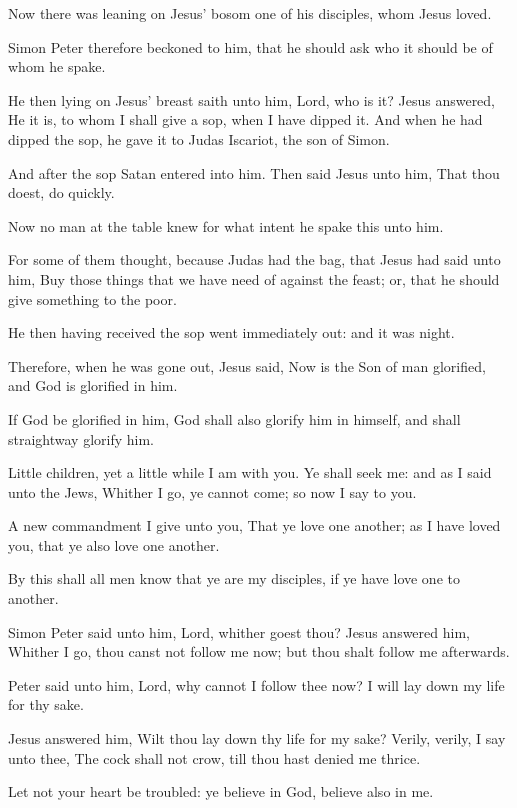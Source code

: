 \Verse Now there was leaning on Jesus' bosom one of his disciples, whom Jesus loved.

\Verse Simon Peter therefore beckoned to him, that he should ask who it should be of whom he spake.

\Verse He then lying on Jesus' breast saith unto him, Lord, who is it?  \Verse Jesus answered, He it is, to whom I shall give a sop, when I have dipped it. And when he had dipped the sop, he gave it to Judas Iscariot, the son of Simon.

\Verse And after the sop Satan entered into him. Then said Jesus unto him, That thou doest, do quickly.

\Verse Now no man at the table knew for what intent he spake this unto him.

\Verse For some of them thought, because Judas had the bag, that Jesus had said unto him, Buy those things that we have need of against the feast; or, that he should give something to the poor.

\Verse He then having received the sop went immediately out: and it was night.

\Verse Therefore, when he was gone out, Jesus said, Now is the Son of man glorified, and God is glorified in him.

\Verse If God be glorified in him, God shall also glorify him in himself, and shall straightway glorify him.

\Verse Little children, yet a little while I am with you. Ye shall seek me: and as I said unto the Jews, Whither I go, ye cannot come; so now I say to you.

\Verse A new commandment I give unto you, That ye love one another; as I have loved you, that ye also love one another.

\Verse By this shall all men know that ye are my disciples, if ye have love one to another.

\Verse Simon Peter said unto him, Lord, whither goest thou? Jesus answered him, Whither I go, thou canst not follow me now; but thou shalt follow me afterwards.

\Verse Peter said unto him, Lord, why cannot I follow thee now? I will lay down my life for thy sake.

\Verse Jesus answered him, Wilt thou lay down thy life for my sake?  Verily, verily, I say unto thee, The cock shall not crow, till thou hast denied me thrice.


\Chapter
\Verse Let not your heart be troubled: ye believe in God, believe also in me.


